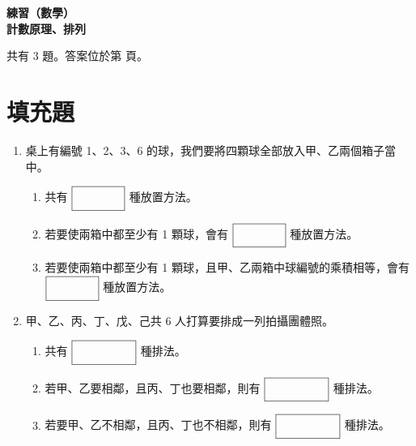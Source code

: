 \documentclass[10pt]{article}
\newcommand*{\blank}[1]{\rule[-.7\baselineskip]{0pt}{1.8\baselineskip}\fbox{\rule[-.4\baselineskip]{0pt}{1.2\baselineskip}\hspace{#1}}}
\renewcommand*{\maketitle}{{%
  \bfseries
  \LARGE 練習（數學） \\
  \large 計數原理、排列 \par
}}
\begin{document}
\maketitle
\medskip
共有 3 題。答案位於第 \pageref{answer} 頁。
\section{填充題}
\begin{enumerate}[label=\arabic*.,align=left,leftmargin=*,labelsep=.3em]
  \item 桌上有編號 1、2、3、6 的球，我們要將四顆球全部放入甲、乙兩個箱子當中。
  \begin{enumerate}[label=(\arabic*),align=left,leftmargin=*,labelsep=.3em]
    \item 共有 $\blank{4em}$ 種放置方法。
    \item 若要使兩箱中都至少有 1 顆球，會有 $\blank{4em}$ 種放置方法。
    \item 若要使兩箱中都至少有 1 顆球，且甲、乙兩箱中球編號的乘積相等，會有 $\blank{4em}$ 種放置方法。
  \end{enumerate}
  \newpage
  \item 甲、乙、丙、丁、戊、己共 6 人打算要排成一列拍攝團體照。
  \begin{enumerate}[label=(\arabic*),align=left,leftmargin=*,labelsep=.3em]
    \item 共有 $\blank{5em}$ 種排法。
    \item 若甲、乙要相鄰，且丙、丁也要相鄰，則有 $\blank{5em}$ 種排法。
    \item 若要甲、乙不相鄰，且丙、丁也不相鄰，則有 $\blank{5em}$ 種排法。
  \end{enumerate}  
\end{enumerate}

\newpage
\end{document}
